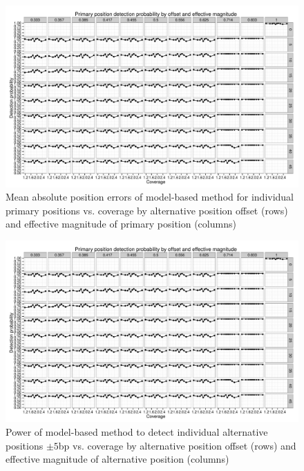 \begin{figure}
\includegraphics[page=5,width=0.95\textheight]{figures/nucleosomes/plots_power_pm3}
\caption{Mean absolute position errors of model-based method for individual primary positions vs. coverage by alternative position offset (rows) and effective magnitude of primary position (columns)}
\end{figure}



\begin{figure}
\includegraphics[page=9,width=0.95\textheight]{figures/nucleosomes/plots_power_pm3}
\caption{Power of model-based method to detect individual alternative positions $\pm 5$bp vs. coverage by alternative position offset (rows) and effective magnitude of alternative position (columns)}
\end{figure}

